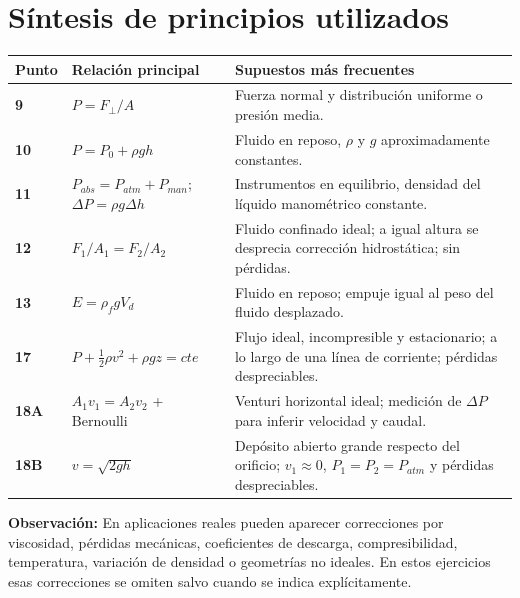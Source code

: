 \documentclass[11pt,a4paper]{article}
\begin{document}
\section*{Síntesis de principios utilizados}
\begin{tabular}{>{\bfseries}p{2cm}p{5cm}p{8cm}}
\toprule
Punto & Relación principal & Supuestos más frecuentes \\
\midrule
9 & $P=F_\perp/A$ & Fuerza normal y distribución uniforme o presión media.\\
10 & $P=P_0+\rho gh$ & Fluido en reposo, $\rho$ y $g$ aproximadamente constantes.\\
11 & $P_{abs}=P_{atm}+P_{man}$; $\Delta P=\rho g\Delta h$ & Instrumentos en equilibrio, densidad del líquido manométrico constante.\\
12 & $F_1/A_1=F_2/A_2$ & Fluido confinado ideal; a igual altura se desprecia corrección hidrostática; sin pérdidas.\\
13 & $E=\rho_f gV_d$ & Fluido en reposo; empuje igual al peso del fluido desplazado.\\
17 & $P+\frac12\rho v^2+\rho gz=cte$ & Flujo ideal, incompresible y estacionario; a lo largo de una línea de corriente; pérdidas despreciables.\\
18A & $A_1v_1=A_2v_2$ + Bernoulli & Venturi horizontal ideal; medición de $\Delta P$ para inferir velocidad y caudal.\\
18B & $v=\sqrt{2gh}$ & Depósito abierto grande respecto del orificio; $v_1\approx0$, $P_1=P_2=P_{atm}$ y pérdidas despreciables.\\
\bottomrule
\end{tabular}

\vspace{5mm}
\textbf{Observación:} En aplicaciones reales pueden aparecer correcciones por viscosidad, pérdidas mecánicas, coeficientes de descarga, compresibilidad, temperatura, variación de densidad o geometrías no ideales. En estos ejercicios esas correcciones se omiten salvo cuando se indica explícitamente.
\end{document}
